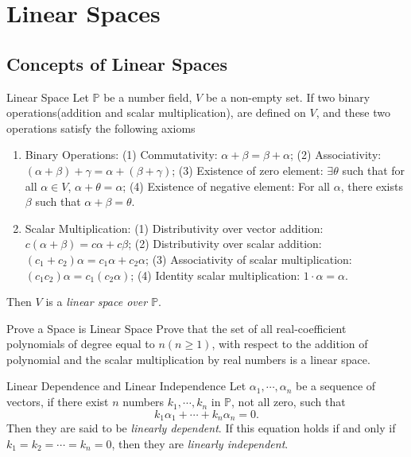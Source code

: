
\section{Linear Spaces}

\subsection{Concepts of Linear Spaces}

\begin{definition}{Linear Space}{}
  Let $\mathbb{P}$ be a number field, $V$ be a non-empty set.
  If two binary operations(addition and scalar multiplication),
  are defined on $V$, and these two operations satisfy the following axioms
  \begin{enumerate}
  \item Binary Operations:
    (1) Commutativity: $\alpha + \beta = \beta + \alpha$;
    (2) Associativity: $(\alpha + \beta) + \gamma = \alpha + (\beta + \gamma)$;
    (3) Existence of zero element: $\exists \theta$ such that for all $\alpha
    \in V$, $\alpha + \theta = \alpha$;
    (4) Existence of negative element: For all $\alpha$, there exists $\beta$ such that $\alpha + \beta
    = \theta$.
  \item Scalar Multiplication:
    (1) Distributivity over vector addition: $c(\alpha + \beta) = c\alpha + c\beta$;
    (2) Distributivity over scalar addition: $(c_1 + c_2)\alpha = c_1 \alpha +
    c_2 \alpha$;
    (3) Associativity of scalar multiplication: $(c_1c_2)\alpha = c_1(c_2\alpha)$;
    (4) Identity scalar multiplication: $1 \cdot \alpha = \alpha$.
  \end{enumerate}
  Then $V$ is a \emph{linear space over $\mathbb{P}$}.
\end{definition}

\begin{example}{Prove a Space is Linear Space}{}
  Prove that the set of all real-coefficient polynomials of degree equal to $n
  (n \geq 1)$, with respect to the addition of polynomial and the scalar multiplication
  by real numbers is a linear space.
\end{example}

\begin{definition}{Linear Dependence and Linear Independence}{}
  Let $\alpha_1, \cdots, \alpha_n$ be a sequence of vectors,
  if there exist $n$ numbers $k_1, \cdots, k_n$ in $\mathbb{P}$, not all zero, such that
  \begin{equation}
    k_1 \alpha_1 + \cdots + k_n \alpha_n = 0.
  \end{equation}
  Then they are said to be \emph{linearly dependent}.
  If this equation holds if and only if $k_1 = k_2 = \cdots = k_n = 0$,
  then they are \emph{linearly independent}.
\end{definition}

